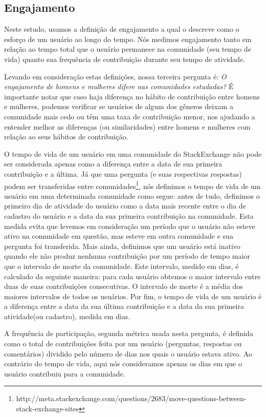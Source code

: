 \subsection{Engajamento}

Neste estudo, usamos a definição de engajamento a qual o descreve como o esforço de um usuário ao longo do tempo. Nós medimos engajamento tanto em relação ao tempo total que o usuário permanece na comunidade (seu tempo de vida) quanto sua frequência de contribuição durante seu tempo de atividade.

Levando em consideração estas definições, nossa terceira pergunta é: \textit{O engajamento de homens e mulheres difere nas comunidades estudadas?} É importante notar que caso haja diferença no hábito de contribuição entre homens e mulheres, podemos verificar se usuários de algum dos gêneros deixam a comunidade mais cedo ou têm uma taxa de contribuição menor, nos ajudando a entender melhor as diferenças (ou similaridades) entre homens e mulheres com relação ao seus hábitos de contribuição.

O tempo de vida de um usuário em uma comunidade do StackExchange não pode ser considerada apenas como a diferença entre a data de sua primeira contribuição e a última. Já que uma pergunta (e suas respectivas respostas) podem ser transferidas entre comunidades\footnote{http://meta.stackexchange.com/questions/2683/move-questions-between-stack-exchange-sites}, nós definimos o tempo de vida de um usuário em uma determinada comunidade como segue: antes de tudo, definimos o primeiro dia de atividade do usuário como a data mais recente entre o dia de cadastro do usuário e a data da sua primeira contribuição na comunidade. Esta medida evita que levemos em consideração um período que o usuário não esteve ativo na comunidade em questão, mas esteve em outra comunidade e sua pergunta foi transferida. Mais ainda, definimos que um usuário está inativo quando ele não produz nenhuma contribuição por um período de tempo maior que o intervalo de morte da comunidade. Este intervalo, medido em dias, é calculado da seguinte maneira: para cada usuário obtemos o maior intervalo entre duas de suas contribuições consecutivas. O intervalo de morte é a média dos maiores intervalos de todos os usuários. Por fim, o tempo de vida de um usuário é a diferença entre a data da sua última contribuição e a data da sua primeira atividade(ou cadastro), medida em dias.

A frequência de participação, segunda métrica usada nesta pergunta, é definida como o total de contribuições feita por um usuário (perguntas, respostas ou comentários) dividido pelo número de dias nos quais o usuário estava ativo. Ao contrário do tempo de vida, aqui nós consideramos apenas os dias em que o usuário contribuiu para a comunidade.

